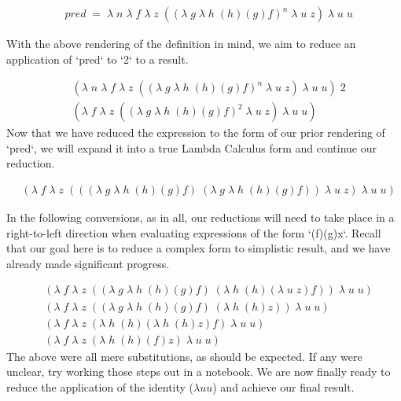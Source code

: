 \documentclass[11pt]{article}
\begin{document}
\begin{align*}
& pred \; = \; \lambda \; n \; \lambda \; f \; \lambda \; z \; ((\lambda \; g \; \lambda \; h \; (h)(g)f)^{n} \; \lambda \; u \; z) \; \lambda \; u \; u
\end{align*}

With the above rendering of the definition in mind, we aim to reduce an application of `pred` to `2` to a result.

\begin{align*}
& (\lambda \; n \; \lambda \; f \; \lambda \; z \; ((\lambda \; g \; \lambda \; h \; (h)(g)f)^{n} \; \lambda \; u \; z) \; \lambda \; u \; u) \; 2
\\& (\lambda \; f \; \lambda \; z \; ((\lambda \; g \; \lambda \; h \; (h)(g)f)^2 \; \lambda \; u \; z) \; \lambda \; u \; u)
\end{align*}
Now that we have reduced the expression to the form of our prior rendering of `pred`, we will expand it into a true Lambda Calculus form and continue our reduction.

\begin{align*}
& (\lambda \; f \; \lambda \; z \; (((\lambda \; g \; \lambda \; h \; (h)(g)f) \; (\lambda \; g \; \lambda \; h \; (h)(g)f)) \; \lambda \; u \; z) \; \lambda \; u \; u)
\end{align*}

In the following conversions, as in all, our reductions will need to take place in a right-to-left direction when evaluating expressions of the form `(f)(g)x`. Recall that our goal here is to reduce a complex form to simplistic result, and we have already made significant progress.

\begin{align*}
& (\lambda \; f \; \lambda \; z \; ((\lambda \; g \; \lambda \; h \; (h)(g)f) \; (\lambda \; h \; (h)(\lambda \; u \; z)f)) \; \lambda \; u \; u)
\\& (\lambda \; f \; \lambda \; z \; ((\lambda \; g \; \lambda \; h \; (h)(g)f) \; (\lambda \; h \; (h)z)) \; \lambda \; u \; u)
\\& (\lambda \; f \; \lambda \; z \; (\lambda \; h \; (h)(\lambda \; h \; (h)z)f) \; \lambda \; u \; u)
\\& (\lambda \; f \; \lambda \; z \; (\lambda \; h \; (h)(f)z) \; \lambda \; u \; u)
\end{align*}
The above were all mere substitutions, as should be expected. If any were unclear, try working those steps out in a notebook. We are now finally ready to reduce the application of the identity ($\lambda u u$) and achieve our final result.
\end{document}
